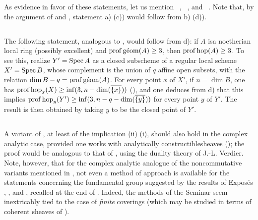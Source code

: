 As evidence in favor of these statements, let us mention ~, ~, and ~. Note that, by the argument of  and , statement a) (\resp c)) would follow from b) (\resp d)).

\subsection{} \label{XIV.6.3}
The following statement, analogous to , would follow from d): if $A$ is\pageoriginale a noetherian local ring (possibly excellent) and $\operatorname{prof} \operatorname{g\acute{e}om} (A) \geq 3$, then $\operatorname{prof} \operatorname{hop} (A) \geq 3$. To see this, realize $Y'=\operatorname{Spec} A$ as a closed subscheme of a regular local scheme $X'=\operatorname{Spec} B$, whose complement is the union of $q$ affine open subsets, with the relation $\dim B -q=\operatorname{prof} \operatorname{g\acute{e}om}(A)$. For every point $x$ of $X'$, if $n=\dim B$, one has $\operatorname{prof} \operatorname{hop}_x(X) \geq \inf(3, n-\dim(\overline{\{x\}}))$ (\cf {}), and one deduces from d) that this implies $\operatorname{prof} \operatorname{hop}_y(Y') \geq \inf(3, n-q-\dim(\overline{\{y\}}))$ for every point $y$ of $Y'$. The result is then obtained by taking $y$ to be the closed point of $Y'$.

\subsection{} \label{XIV.6.4}
A variant of , at least of the implication \textup{(ii)} \ALORS \textup{(i)}, should also hold in the complex analytic case, provided one works with \og analytically constructible\fg sheaves (\cf {}); the proof would be analogous to that of , using the duality theory of J.-L. Verdier. Note, however, that for the complex analytic analogue of the noncommutative variants mentioned in , not even a method of approach is available for the statements concerning the fundamental group suggested by the results of Expos\'{e}s , , and , recalled at the end of . Indeed, the methods of the Seminar seem inextricably tied to the case of \emph{finite} coverings (which may be studied in terms of coherent sheaves of ).

